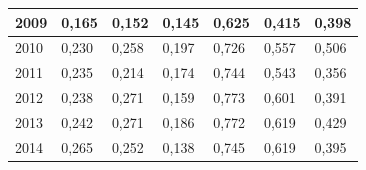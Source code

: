 \begin{table}[H]
\begin{tabular}{|l|l|l|l|l|l|l|}
		2009 & 0,165                                                      & 0,152                                                            & 0,145                                                               & 0,625                                                      & 0,415                                                            & 0,398                                                               \\ \hline
		2010 & 0,230                                                       & 0,258                                                            & 0,197                                                               & 0,726                                                      & 0,557                                                            & 0,506                                                               \\ \hline
		2011 & 0,235                                                      & 0,214                                                            & 0,174                                                               & 0,744                                                      & 0,543                                                            & 0,356                                                               \\ \hline
		2012 & 0,238                                                      & 0,271                                                            & 0,159                                                               & 0,773                                                      & 0,601                                                            & 0,391                                                               \\ \hline
		2013 & 0,242                                                      & 0,271                                                            & 0,186                                                               & 0,772                                                      & 0,619                                                            & 0,429                                                               \\ \hline
		2014 & 0,265                                                      & 0,252                                                            & 0,138                                                               & 0,745                                                      & 0,619                                                            & 0,395                                                               \\ \hline

\end{tabular}
\end{table}
